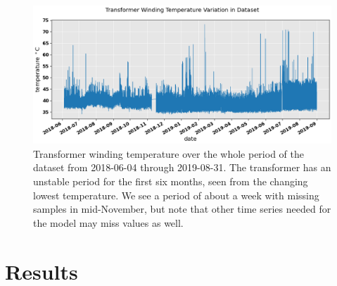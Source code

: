 \documentclass[]{article}
\begin{document}
\begin{figure}[!h]
	\centering
	\includegraphics[width=1\linewidth]{./figs/winding-temp-all-dataset.png}
	\caption{Transformer winding temperature over the whole period of the dataset from 2018-06-04 through 2019-08-31. The transformer has an unstable period for the first six months, seen from the changing lowest temperature. We see a period of about a week with missing samples in mid-November, but note that other time series needed for the model may miss values as well.}
	\label{fig:winding-temp-all-dataset}
\end{figure}





\section{Results} \label{sec:results}
\end{document}
